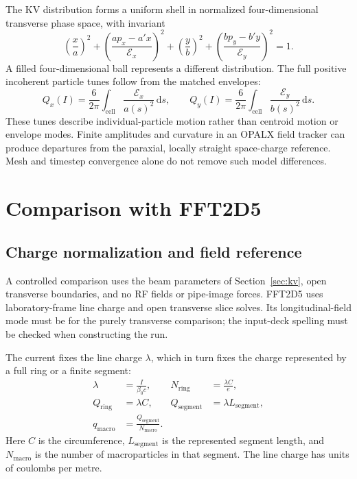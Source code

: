\documentclass[11pt,a4paper]{article}
\numberwithin{equation}{section}
\begin{document}
The KV distribution forms a uniform shell in normalized four-dimensional
transverse phase space, with invariant
\begin{equation}
  \left(\frac{x}{a}\right)^2
  +\left(\frac{ap_x-a'x}{\mathcal E_x}\right)^2
  +\left(\frac{y}{b}\right)^2
  +\left(\frac{bp_y-b'y}{\mathcal E_y}\right)^2=1.
  \label{eq:kv-invariant}
\end{equation}
A filled four-dimensional ball represents a different distribution. The
full positive incoherent particle tunes follow from the matched envelopes:
\begin{equation}
  Q_x(I)=\frac{6}{2\pi}\int_{\mathrm{cell}}
             \frac{\mathcal E_x}{a(s)^2}\,\mathrm ds,\qquad
  Q_y(I)=\frac{6}{2\pi}\int_{\mathrm{cell}}
             \frac{\mathcal E_y}{b(s)^2}\,\mathrm ds.
  \label{eq:kv-tunes}
\end{equation}
These tunes describe individual-particle motion rather than centroid
motion or envelope modes. Finite amplitudes and curvature in an OPALX
field tracker can produce departures from the paraxial, locally straight
space-charge reference. Mesh and timestep convergence alone do not remove
such model differences.

\section{Comparison with FFT2D5}
\label{sec:fft2d5}

\subsection{Charge normalization and field reference}

A controlled comparison uses the beam parameters of
Section~\ref{sec:kv}, open transverse boundaries, and no RF fields or
pipe-image forces. FFT2D5 uses laboratory-frame line charge and open
transverse slice solves. Its longitudinal-field mode must be
 for the purely transverse
comparison; the input-deck spelling must be checked when constructing
the run.

The current fixes the line charge $\lambda$, which in turn fixes the
charge represented by a full ring or a finite segment:
\begin{equation}
  \begin{aligned}
    \lambda&=\frac{I}{\beta_0c}, &
    N_{\mathrm{ring}}&=\frac{\lambda C}{e},\\
    Q_{\mathrm{ring}}&=\lambda C, &
    Q_{\mathrm{segment}}&=\lambda L_{\mathrm{segment}},\\
    q_{\mathrm{macro}}&=\frac{Q_{\mathrm{segment}}}{N_{\mathrm{macro}}}.
  \end{aligned}
  \label{eq:charge}
\end{equation}
Here $C$ is the circumference, $L_{\mathrm{segment}}$ is the represented
segment length, and $N_{\mathrm{macro}}$ is the number of macroparticles
in that segment. The line charge has units of coulombs per metre.
\end{document}
